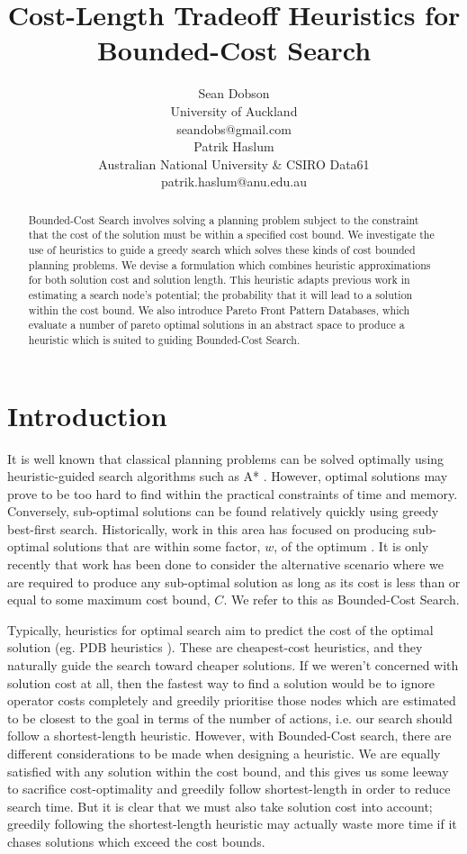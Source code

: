 \documentclass[letterpaper]{article} %
\title{Cost-Length Tradeoff Heuristics for Bounded-Cost Search}
\author{Sean Dobson \\
        University of Auckland \\
        seandobs@gmail.com \\
   \And Patrik Haslum \\
        Australian National University \& CSIRO Data61 \\
        patrik.haslum@anu.edu.au
   }
\begin{document}
\maketitle
\begin{abstract}
Bounded-Cost Search involves solving a planning
problem subject to the constraint that the cost
of the solution must be within a specified cost bound.
We investigate the use of heuristics
to guide a greedy search which solves these kinds of cost bounded planning
problems.
We devise a formulation
which combines heuristic approximations for both solution cost
and solution length. This heuristic adapts previous work in estimating a search node's potential;
the probability that it will lead to a solution within the cost bound.
We also introduce Pareto Front Pattern Databases, which evaluate a number of
pareto optimal solutions in an abstract space to produce
a heuristic which is suited to guiding Bounded-Cost Search.
\end{abstract}
\section{Introduction}
It is well known that classical planning problems can
be solved optimally using heuristic-guided search algorithms such as A* \cite{hart1968formal}.
However, optimal solutions may prove to be too hard to find within the practical
constraints of time and memory. Conversely,
sub-optimal solutions can be found relatively quickly using greedy best-first search.
Historically, work in this area has focused on producing
sub-optimal solutions that are within some factor, \(w\), of the optimum \cite{pohl1970heuristic}.
It is only recently \cite{stern2011potential,thayer2012faster,haslum2013heuristics} that work has been done to consider
the alternative scenario where we are required to produce any sub-optimal solution
as long as its cost is less than or equal to some maximum cost bound, \(C\).
We refer to this as Bounded-Cost Search.

Typically, heuristics for optimal search aim to predict the cost of the optimal solution (eg. PDB heuristics \cite{culberson1996searching,felner2004additive,haslum2007domain,helmert2007flexible}).
These are cheapest-cost heuristics, and they naturally guide the search toward cheaper solutions.
If we weren't concerned with solution cost at all,
then the fastest way to find a solution would be to ignore operator costs completely
and greedily prioritise those nodes which are estimated to be closest to the goal in terms
of the number of actions, i.e. our search should follow a shortest-length heuristic.
However, with Bounded-Cost search, there are different considerations to be
made when designing a heuristic.
We are equally satisfied with any solution within the cost bound,
and this gives us some leeway to sacrifice cost-optimality
and greedily follow shortest-length in order to reduce search time.
But it is clear that we must also take solution cost into account;
greedily following the shortest-length heuristic may actually waste more time
if it chases solutions which exceed the cost bounds.
\end{document}
